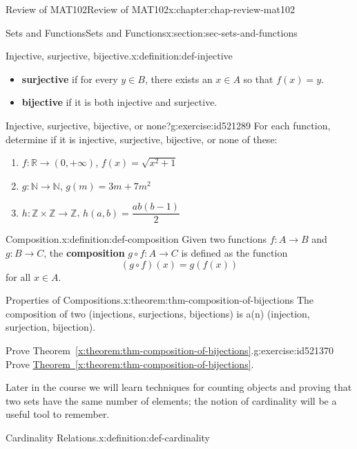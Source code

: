 \documentclass[oneside,10pt,]{book}
\newcommand{\xreffont}{\relax}
\newcommand{\terminology}[1]{\textbf{#1}}
\numberwithin{equation}{section}
\begin{document}
\begin{chapterptx}{Review of MAT102}{}{Review of MAT102}{}{}{x:chapter:chap-review-mat102}
\begin{sectionptx}{Sets and Functions}{}{Sets and Functions}{}{}{x:section:sec-sets-and-functions}
\begin{definition}{Injective, surjective, bijective.}{x:definition:def-injective}
\begin{itemize}[label=\textbullet]
\item{}\terminology{surjective} if for every \(y \in B\), there exists an \(x \in A\) so that \(f(x) = y\).%
\item{}\terminology{bijective} if it is both injective and surjective.%
\end{itemize}
%
\end{definition}
\begin{inlineexercise}{Injective, surjective, bijective, or none?}{g:exercise:id521289}%
For each function, determine if it is injective, surjective, bijective, or none of these:%
%
\begin{enumerate}[label=(\alph*)]
\item{}\(f: \mathbb{R} \rightarrow (0,+\infty)\), \(f(x) = \sqrt{x^2+1}\)%
\item{}\(g: \mathbb{N} \rightarrow \mathbb{N}\), \(g(m) = 3m + 7m^2\)%
\item{}\(h: \mathbb{Z} \times \mathbb{Z} \rightarrow \mathbb{Z}\), \(h(a,b) = \dfrac{ab(b-1)}{2}\)%
\end{enumerate}
\end{inlineexercise}%
\begin{definition}{Composition.}{x:definition:def-composition}%
\label{g:notation:id521347} Given two functions \(f: A \rightarrow B\) and \(g: B \rightarrow C\), the \terminology{composition} \(g \circ f: A \rightarrow C\) is defined as the function%
\begin{equation*}
(g \circ f)(x) = g(f(x))
\end{equation*}
for all \(x \in A\).%
\end{definition}
\begin{theorem}{Properties of Compositions.}{}{x:theorem:thm-composition-of-bijections}%
The composition of two (injections, surjections, bijections) is a(n) (injection, surjection, bijection).%
\end{theorem}
\begin{inlineexercise}{Prove Theorem~{\xreffont\ref*{x:theorem:thm-composition-of-bijections}}.}{g:exercise:id521370}%
Prove \hyperref[x:theorem:thm-composition-of-bijections]{Theorem~{\xreffont\ref{x:theorem:thm-composition-of-bijections}}}.%
\end{inlineexercise}%
Later in the course we will learn techniques for counting objects and proving that two sets have the same number of elements; the notion of cardinality will be a useful tool to remember.%
\begin{definition}{Cardinality Relations.}{x:definition:def-cardinality}%

\end{definition}
\end{sectionptx}
\end{chapterptx}
\end{document}
